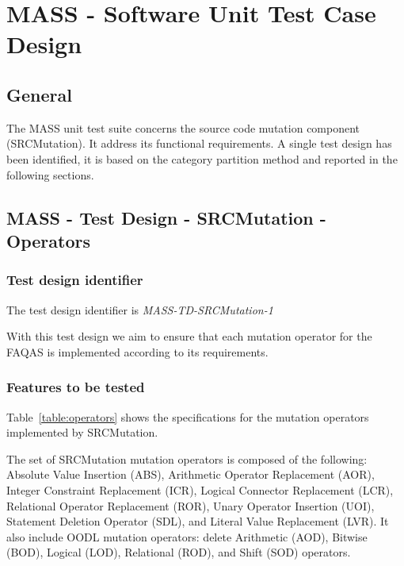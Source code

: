 
\chapter{MASS - Software Unit Test Case Design}
\label{chap:spec}


\section{General}

The MASS unit test suite concerns the source code mutation component (SRCMutation). It address its functional requirements. A single test design has been identified, it is based on the category partition method and reported in the following sections.



\section{MASS - Test Design - SRCMutation - Operators}

\subsection{Test design identifier}

The test design identifier is \emph{MASS-TD-SRCMutation-1}

With this test design we aim to ensure that each mutation operator for the FAQAS is implemented according to its requirements.

\subsection{Features to be tested}

Table~\ref{table:operators} shows the specifications for the mutation operators implemented by SRCMutation.

The set of SRCMutation mutation operators is composed of the following: Absolute Value Insertion (ABS), Arithmetic Operator Replacement (AOR), Integer Constraint Replacement (ICR), Logical Connector Replacement (LCR), Relational Operator Replacement (ROR), Unary Operator Insertion (UOI), Statement Deletion Operator (SDL), and Literal Value Replacement (LVR).
It also include OODL mutation operators: delete Arithmetic (AOD), Bitwise (BOD), Logical (LOD), Relational (ROD), and Shift (SOD) operators.




